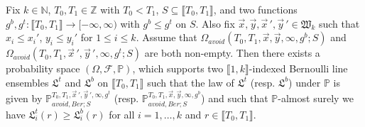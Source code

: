 \begin{lemma}
	Fix $k \in \mathbb{N}$, $T_0, T_1 \in \mathbb{Z}$ with $T_0 < T_1$, $S\subseteq\llbracket T_0, T_1\rrbracket$, and two functions $g^b, g^t: \llbracket T_0, T_1 \rrbracket  \rightarrow [-\infty, \infty)$ with $g^b\leq g^t$ on $S$. Also fix $\vec{x}, \vec{y}, \vec{x}\,', \vec{y}\,' \in \mathfrak{W}_k$ such that $x_i\leq x_i'$, $y_i\leq y_i'$ for $1\leq i\leq k$. Assume that $\Omega_{avoid}(T_0, T_1, \vec{x}, \vec{y}, \infty,g^b; S)$ and $\Omega_{avoid}(T_0, T_1, \vec{x}\,', \vec{y}\,', \infty,g^t; S)$ are both non-empty. Then there exists a probability space $(\Omega, \mathcal{F}, \mathbb{P})$, which supports two $\llbracket 1, k \rrbracket$-indexed Bernoulli line ensembles $\mathfrak{L}^t$ and $\mathfrak{L}^b$ on $\llbracket T_0, T_1 \rrbracket$ such that the law of $\mathfrak{L}^{t}$ {\big (}resp. $\mathfrak{L}^b${\big )} under $\mathbb{P}$ is given by $\mathbb{P}_{avoid, Ber; S}^{T_0, T_1, \vec{x}\,', \vec{y}\,', \infty, g^t}$ {\big (}resp. $\mathbb{P}_{avoid, Ber; S}^{T_0, T_1, \vec{x}, \vec{y}, \infty, g^b}${\big )} and such that $\mathbb{P}$-almost surely we have $\mathfrak{L}_i^t(r) \geq \mathfrak{L}^b_i(r)$ for all $i = 1,\dots, k$ and $r \in \llbracket T_0, T_1 \rrbracket$.
\end{lemma}

